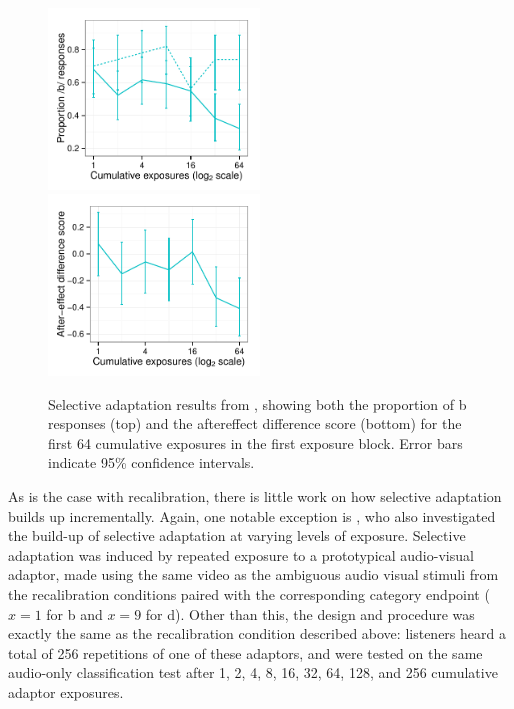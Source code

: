 \begin{figure}[htb]
  \centering
  \includegraphics[width=0.5\textwidth]{vroomen-bd-selad-first-64.pdf}
  \includegraphics[width=0.5\textwidth]{vroomen-ae-selad-first-64.pdf}
  \caption{Selective adaptation results from \protect\textcite{Vroomen2007}, showing both the proportion of \ph b responses (top) and the aftereffect difference score (bottom) for the first 64 cumulative exposures in the first exposure block. Error bars indicate 95\% confidence intervals.}
  \label{fig:vroomen-results-64-selad}
\end{figure}

As is the case with recalibration, there is little work on how selective adaptation builds up incrementally.  Again, one notable exception is \textcite{Vroomen2007}, who also investigated the build-up of selective adaptation at varying levels of exposure.  Selective adaptation was induced by repeated exposure to a prototypical audio-visual adaptor, made using the same video as the ambiguous audio visual stimuli from the recalibration conditions paired with the corresponding category endpoint ($x=1$ for \ph b and $x=9$ for \ph d).  Other than this, the design and procedure was exactly the same as the recalibration condition described above: listeners heard a total of 256 repetitions of one of these adaptors, and were tested on the same audio-only classification test after 1, 2, 4, 8, 16, 32, 64, 128, and 256 cumulative adaptor exposures.

